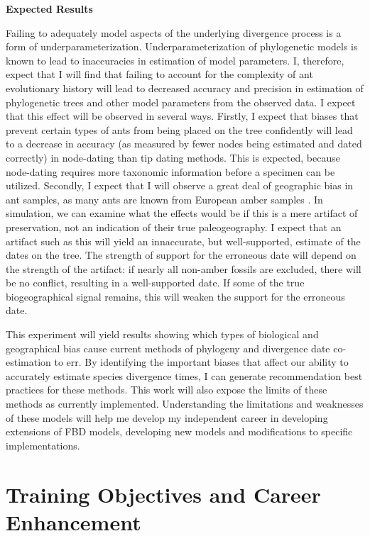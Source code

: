 \documentclass[]{article}
\begin{document}
\textbf{Expected Results} \par 
Failing to adequately model aspects of the underlying divergence process is a form of underparameterization. Underparameterization of phylogenetic models is known to lead to inaccuracies in estimation of model parameters. I, therefore, expect that I will find that failing to account for the complexity of ant evolutionary history will lead to decreased accuracy and precision in estimation of phylogenetic trees and other model parameters from the observed data. I expect that this effect will be observed in several ways. Firstly, I expect that biases that prevent certain types of ants from being placed on the tree confidently will lead to a decrease in accuracy (as measured by fewer nodes being estimated and dated correctly) in node-dating than tip dating methods. This is expected, because node-dating requires more taxonomic information before a specimen can be utilized. Secondly, I expect that I will observe a great deal of geographic bias in ant samples, as many ants are known from European amber samples \citep{perrichot2008fossil}. In simulation, we can examine what the effects would be if this is a mere artifact of preservation, not an indication of their true paleogeography. I expect that an artifact such as this will yield an innaccurate, but well-supported, estimate of the dates on the tree. The strength of support for the erroneous date will depend on the strength of the artifact: if nearly all non-amber fossils are excluded, there will be no conflict, resulting in a well-supported date. If some of the true biogeographical signal remains, this will weaken the support for the erroneous date. \par
This experiment will yield results showing which types of biological and geographical bias cause current methods of phylogeny and divergence date co-estimation to err.  By identifying the important biases that affect our ability to accurately estimate species divergence times, I can generate recommendation best practices for these methods. This work will also expose the limits of these methods as currently implemented. Understanding the limitations and weaknesses of these models will help me develop my independent career in developing extensions of FBD models, developing new models and modifications to specific implementations.
\section*{Training Objectives and Career Enhancement}
\end{document}
